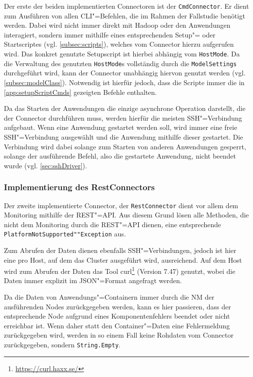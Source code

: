 Der erste der beiden implementierten Connectoren ist der \texttt{CmdConnector}.
Er dient zum Ausführen von allen CLI"=Befehlen, die im Rahmen der Fallstudie benötigt werden.
Dabei wird nicht immer direkt mit Hadoop oder den Anwendungen interagiert, sondern immer mithilfe eines entsprechenden Setup"= oder Startscriptes (vgl. \cref{subsec:scripts}), welches vom Connector hierzu aufgerufen wird.
Das konkret genutzte Setupscript ist hierbei abhängig vom \texttt{HostMode}.
Da die Verwaltung des genutzten \texttt{HostMode}s vollständig durch die \texttt{ModelSettings} durchgeführt wird, kann der Connector unabhängig hiervon genutzt werden (vgl. \cref{subsec:modelClass}).
Notwendig ist hierfür jedoch, dass die Scripte immer die in \cref{app:setupScriptCmds} gezeigten Befehle enthalten.

Da das Starten der Anwendungen die einzige asynchrone Operation darstellt, die der Connector durchführen muss, werden hierfür die meisten SSH"=Verbindung aufgebaut.
Wenn eine Anwendung gestartet werden soll, wird immer eine freie SSH"=Verbindung ausgewählt und die Anwendung mithilfe dieser gestartet.
Die Verbindung wird dabei solange zum Starten von anderen Anwendungen gesperrt, solange der ausführende Befehl, also die gestartete Anwendung, nicht beendet wurde (vgl. \cref{sec:sshDriver}).

\subsubsection{Implementierung des RestConnectors}
\label{subsubsec:implRestConnector}

Der zweite implementierte Connector, der \texttt{RestConnector} dient vor allem dem Monitoring mithilfe der REST"=API.
Aus diesem Grund lösen alle Methoden, die nicht dem Monitoring durch die REST"=API dienen, eine entsprechende \texttt{PlatformNotSupported""Exception} aus.

Zum Abrufen der Daten dienen ebenfalls SSH"=Verbindungen, jedoch ist hier eine pro Host, auf dem das Cluster ausgeführt wird, ausreichend.
Auf dem Host wird zum Abrufen der Daten das Tool curl\footnote{\url{https://curl.haxx.se/}} (Version 7.47) genutzt, wobei die Daten immer explizit im JSON"=Format angefragt werden.

Da die Daten von Anwendungs"=Containern immer durch die \ac{NM} der ausführenden Nodes zurückgegeben werden, kann es hier passieren, dass der entsprechende Node aufgrund eines Komponentenfehlers beendet oder nicht erreichbar ist.
Wenn daher statt den Container"=Daten eine Fehlermeldung zurückgegeben wird, werden in so einem Fall keine Rohdaten vom Connector zurückgegeben, sondern \texttt{String.Empty}.

